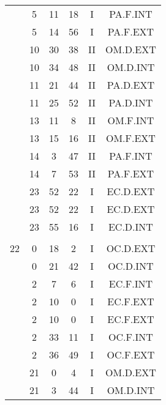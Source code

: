 \documentclass[12pt, a4paper]{article}
\begin{document}
\begin{multicols}{3}
{\begin{tabular}{c c c c c c}
	 	 	 	 & 5 & 11 & 18 & I & PA.F.INT\\%
	 	 	 	 & 5 & 14 & 56 & I & PA.F.EXT\\%
	 	 	 	 & 10 & 30 & 38 & II & OM.D.EXT\\%
	 	 	 	 & 10 & 34 & 48 & II & OM.D.INT\\%
	 	 	 	 & 11 & 21 & 44 & II & PA.D.EXT\\%
	 	 	 	 & 11 & 25 & 52 & II & PA.D.INT\\%
	 	 	 	 & 13 & 11 & 8 & II & OM.F.INT\\%
	 	 	 	 & 13 & 15 & 16 & II & OM.F.EXT\\%
	 	 	 	 & 14 & 3 & 47 & II & PA.F.INT\\%
	 	 	 	 & 14 & 7 & 53 & II & PA.F.EXT\\%
	 	 	 	 & 23 & 52 & 22 & I & EC.D.EXT\\%
	 	 	 	 & 23 & 52 & 22 & I & EC.D.EXT\\%
	 	 	 	 & 23 & 55 & 16 & I & EC.D.INT\\%
	 	 	 	 & & & & & \\%
	 	 	 	22 & 0 & 18 & 2 & I & OC.D.EXT\\%
	 	 	 	 & 0 & 21 & 42 & I & OC.D.INT\\%
	 	 	 	 & 2 & 7 & 6 & I & EC.F.INT\\%
	 	 	 	 & 2 & 10 & 0 & I & EC.F.EXT\\%
	 	 	 	 & 2 & 10 & 0 & I & EC.F.EXT\\%
	 	 	 	 & 2 & 33 & 11 & I & OC.F.INT\\%
	 	 	 	 & 2 & 36 & 49 & I & OC.F.EXT\\%
	 	 	 	 & 21 & 0 & 4 & I & OM.D.EXT\\%
	 	 	 	 & 21 & 3 & 44 & I & OM.D.INT\\%

\end{tabular}}
\end{multicols}
\end{document}
